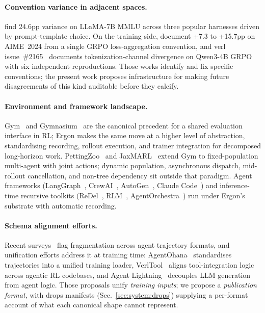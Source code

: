 \documentclass{article}
\begin{document}
\paragraph{Convention variance in adjacent spaces.}
\citet{biderman2024} find 24.6pp variance on LLaMA-7B MMLU
across three popular harnesses driven by prompt-template
choice. On the training side, \citet{liu2025drgrpo} document
+7.3 to +15.7pp on AIME~2024 from a single GRPO
loss-aggregation convention, and verl
issue~\#2165~\citep{verl2165} documents tokenization-channel
divergence on Qwen3-4B GRPO with six independent
reproductions. Those works identify and fix specific
conventions; the present work proposes infrastructure for
making future disagreements of this kind auditable before
they calcify.

\paragraph{Environment and framework landscape.}
Gym~\citep{brockman2016gym} and
Gymnasium~\citep{towers2024gymnasium} are the canonical
precedent for a shared evaluation interface in RL; Ergon makes
the same move at a higher level of abstraction, standardising
recording, rollout execution, and trainer integration for
decomposed long-horizon work.
PettingZoo~\citep{terry2021pettingzoo} and
JaxMARL~\citep{rutherford2024jaxmarl} extend Gym to
fixed-population multi-agent with joint actions; dynamic
population, asynchronous dispatch, mid-rollout cancellation,
and non-tree dependency sit outside that paradigm. Agent
frameworks (LangGraph~\citep{langgraph2024},
CrewAI~\citep{crewai2024}, AutoGen~\citep{wu2024autogen},
Claude Code~\citep{claudecode2024}) and inference-time
recursive toolkits (ReDel~\citep{zhu2024redel},
RLM~\citep{zhang2025rlm},
AgentOrchestra~\citep{agentorchestra2025}) run under Ergon's
substrate with automatic recording.

\paragraph{Schema alignment efforts.} Recent
surveys~\citep{yehudai2025agenteval, cemri2025mast,
yang2025agentprotocols} flag fragmentation across agent
trajectory formats, and unification efforts address it at
training time:
AgentOhana~\citep{zhang2024agentohana} standardises
trajectories into a unified training loader,
VerlTool~\citep{jiang2025verltool} aligns tool-integration
logic across agentic RL codebases, and Agent
Lightning~\citep{luo2025agentlightning} decouples LLM
generation from agent logic. Those proposals unify
\emph{training inputs}; we propose a \emph{publication
format}, with drops manifests
(Sec.~\ref{sec:system:drops}) supplying a per-format account
of what each canonical shape cannot represent.
\end{document}

